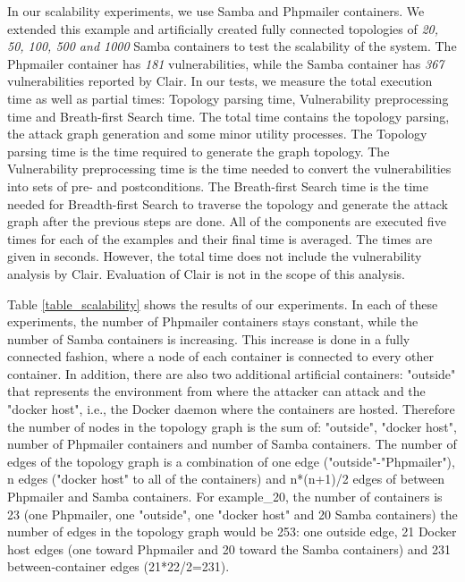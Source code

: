 In our scalability experiments, we use Samba \cite{samba} and Phpmailer \cite{phpmailer} containers. We extended this example and artificially created fully connected topologies of \textit{20, 50, 100, 500 and 1000} Samba containers to test the scalability of the system. The Phpmailer container has \textit{181} vulnerabilities, while the Samba container has \textit{367} vulnerabilities reported by Clair. In our tests, we measure the total execution time as well as partial times: Topology parsing time, Vulnerability preprocessing time and Breath-first Search time. The total time contains the topology parsing, the attack graph generation and some minor utility processes. The Topology parsing time is the time required to generate the graph topology. The Vulnerability preprocessing time is the time needed to convert the vulnerabilities into sets of pre- and postconditions. The Breath-first Search time is the time needed for Breadth-first Search to traverse the topology and generate the attack graph after the previous steps are done. All of the components are executed five times for each of the examples and their final time is averaged. The times are given in seconds.  However, the total time does not include the vulnerability analysis by Clair. Evaluation of Clair is not in the scope of this analysis.

Table \ref{table_scalability} shows the results of our experiments. In each of these experiments, the number of Phpmailer containers stays constant, while the number of Samba containers is increasing. This increase is done in a fully connected fashion, where a node of each container is connected to every other container. In addition, there are also two additional artificial containers: "outside" that represents the environment from where the attacker can attack and the "docker host", i.e., the Docker daemon where the containers are hosted. Therefore the number of nodes in the topology graph is the sum of: "outside", "docker host", number of Phpmailer containers and number of Samba containers. The number of edges of the topology graph is a combination of one edge ("outside"-"Phpmailer"), n edges ("docker host" to all of the containers) and n*(n+1)/2 edges of between Phpmailer and Samba containers. For example\_20, the number of containers is 23 (one Phpmailer, one "outside", one "docker host" and 20 Samba containers) the number of edges in the topology graph would be 253: one outside edge, 21 Docker host edges (one toward Phpmailer and 20 toward the Samba containers) and 231 between-container edges (21*22/2=231).

